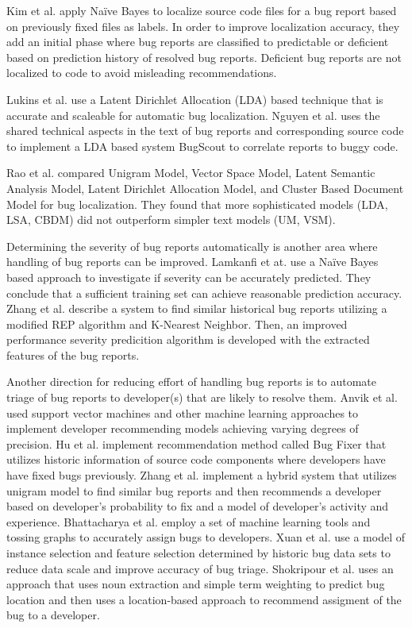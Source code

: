 Kim et al. \cite{Kim:2013:WFT:2554428.2554437} apply Na\"{i}ve Bayes to localize source code files for a bug report based on previously fixed files as labels.  In order to improve localization accuracy, they add an initial phase where bug reports are classified to predictable or deficient based on prediction history of resolved bug reports.  Deficient bug reports are not localized to code to avoid misleading recommendations.

Lukins et al. \cite{Lukins:2010:BLU:1824820.1824850} use a Latent Dirichlet Allocation (LDA) based technique that is accurate and scaleable for automatic bug localization.  Nguyen et al. \cite{Nguyen:2011:TAN:2190078.2190181} uses the shared technical aspects in the text of bug reports and corresponding source code to implement a LDA based system BugScout to correlate reports to buggy code.

Rao et al. \cite{Rao:2011:RSL:1985441.1985451} compared Unigram Model, Vector Space Model, Latent Semantic Analysis Model, Latent Dirichlet Allocation Model, and Cluster Based Document Model for bug localization.  They found that more sophisticated models (LDA, LSA, CBDM) did not outperform simpler text models (UM, VSM).

Determining the severity of bug reports automatically is another area where handling of bug reports can be improved.  Lamkanfi et at. \cite{5463284} use a Na\"{i}ve Bayes based approach to investigate if severity can be accurately predicted.  They conclude that a sufficient training set can achieve reasonable prediction accuracy.  Zhang et al. \cite{Zhang:2016:TMA:2949080.2949249} describe a system to find similar historical bug reports utilizing a modified REP algorithm and K-Nearest Neighbor.  Then, an improved performance severity predicition algorithm is developed with the extracted features of the bug reports.

Another direction for reducing effort of handling bug reports is to automate triage of bug reports to developer(s) that are likely to resolve them.  Anvik et al. \cite{Anvik:2006:FTB:1134285.1134336, Anvik2011ReducingTE} used support vector machines and other machine learning approaches to implement developer recommending models achieving varying degrees of precision.  Hu et al. \cite{Hu2014EffectiveBT} implement recommendation method called Bug Fixer that utilizes historic information of source code components where developers have have fixed bugs previously.  Zhang et al. \cite{Zhang2013AHB} implement a hybrid system that utilizes unigram model to find similar bug reports and then recommends a developer based on developer's probability to fix and a model of developer's activity and experience.  Bhattacharya et al. \cite{Bhattacharya:2012:AHB:2330373.2330434} employ a set of machine learning tools and tossing graphs to accurately assign bugs to developers.  Xuan et al. \cite{Xuan2015TowardsEB} use a model of instance selection and feature selection determined by historic bug data sets to reduce data scale and improve accuracy of bug triage. Shokripour et al. \cite{Shokripour:2013:WSC:2487085.2487089} uses an approach that uses noun extraction and simple term weighting to predict bug location and then uses a location-based approach to recommend assigment of the bug to a developer.

